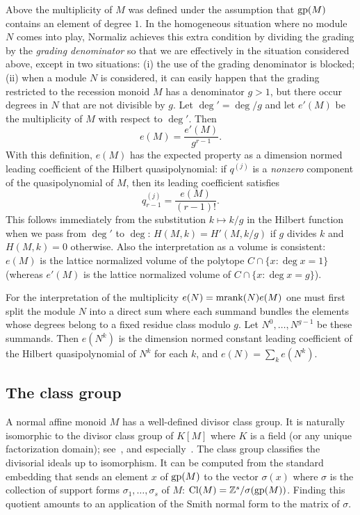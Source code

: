 Above the multiplicity of $M$ was defined under the assumption that $\operatorname{gp}(M)$ contains an element of degree $1$. In the homogeneous situation where no module $N$ comes into play, Normaliz achieves this extra condition by dividing the grading by the \emph{grading denominator} so that we are effectively in the situation considered above, except in two situations:
(i) the use of the grading denominator is blocked; (ii) when a module $N$ is considered, it can easily happen that the grading restricted to the recession monoid $M$ has a denominator $g>1$, but there occur degrees in $N$ that are not divisible by $g$. Let $\deg'=\deg/g$ and let $e'(M)$ be the multiplicity of $M$ with respect to $\deg'$. Then
$$
e(M)=\frac{e'(M)}{g^{r-1}}.
$$
With this definition, $e(M)$ has the expected property as a dimension normed leading coefficient of the Hilbert quasipolynomial: if $q^{(j)}$ is a \emph{nonzero} component of the quasipolynomial of $M$, then its leading coefficient satisfies
$$
q_{r-1}^{(j)}=\frac{e(M)}{(r-1)!}.
$$
This follows immediately from the substitution $k\mapsto k/g$ in the Hilbert function when we pass from $\deg'$ to $\deg$: $H(M,k)=H'(M,k/g)$ if $g$ divides $k$ and $H(M,k)=0$ otherwise. Also the interpretation as a volume is consistent: $e(M)$ is the lattice normalized volume of the polytope $C\cap\{x:\deg x=1 \}$ (whereas $e'(M)$ is the lattice normalized volume of $C\cap\{x:\deg x=g \}$).

For the interpretation of the multiplicity $e(N)=\operatorname{mrank}(N)e(M)$ one must first split the module $N$ into a direct sum where each summand bundles the elements whose degrees belong to a fixed residue class modulo $g$. Let $N^0,\dots,N^{g-1}$ be these summands. Then $e(N^k)$ is the dimension normed constant leading coefficient of the Hilbert quasipolynomial of $N^k$ for each $k$, and $e(N)=\sum_k e(N^k)$.

\subsection{The class group}

A normal affine monoid $M$ has a well-defined divisor class group. It is naturally isomorphic to the divisor class group of $K[M]$ where $K$ is a field (or any unique factorization domain); see~\cite[Section~4.F]{BG}, and especially~\cite[Corollary~4.56]{BG}. The class group classifies the divisorial ideals up to isomorphism. It can be computed from the standard embedding that sends an element $x$ of $\operatorname{gp}(M)$ to the vector $\sigma(x)$ where $\sigma$ is the collection of support forms $\sigma_1,\dots,\sigma_s$ of $M$: $\operatorname{Cl}(M)={\mathbb Z}^s/\sigma(\operatorname{gp}(M))$. Finding this quotient amounts to an application of the Smith normal form to the matrix of $\sigma$.

